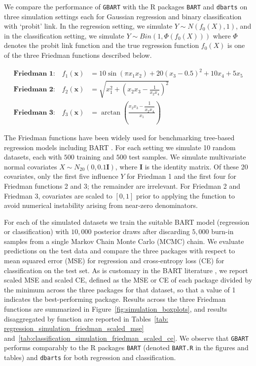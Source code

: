 \documentclass[12pt]{article}
\newcommand{\1}{\mathbb{I}}
\theoremstyle{plain}
\theoremstyle{definition}
\theoremstyle{remark}
\begin{document}
We compare the performance of \texttt{GBART} with the R packages \texttt{BART} and \texttt{dbarts} on three simulation settings each for Gaussian regression and binary classification with `probit' link. In the regression setting, we simulate $Y \sim N(f_0(X), 1)$, and in the classification setting, we simulate $Y \sim Bin(1,\Phi(f_0(X)))$ where $\Phi$ denotes the probit link function and the true regression function $f_0(X)$ is one of the three Friedman functions \citep{friedman1991multivariate, friedman1993} described below.

\begin{align}
\textbf{Friedman 1:} \quad f_1(\mathbf{x}) &= 10\sin(\pi x_1 x_2) + 20\left(x_3 - 0.5\right)^2 + 10x_4 + 5x_5 \label{eq:friedman1} \\[6pt]
\textbf{Friedman 2:} \quad f_2(\mathbf{x}) &= \sqrt{x_1^2 + \left(x_2 x_3 - \frac{1}{x_2 x_4}\right)^2} \label{eq:friedman2} \\[6pt]
\textbf{Friedman 3:} \quad f_3(\mathbf{x}) &= \arctan\left(\frac{x_2 x_3 - \dfrac{1}{x_2 x_4}}{x_1}\right) \label{eq:friedman3}
\end{align}

The Friedman functions have been widely used for benchmarking tree-based regression models including BART \citep{chipman2010bart, linero2025generalized}. For each setting we simulate 10 random datasets, each with $500$ training and $500$ test samples. We simulate multivariate normal covariates $X \sim N_{20}(0, 0.1\mathbf{I})$, where $\mathbf{I}$ is the identity matrix. Of these 20 covariates, only the first five influence $Y$ for Friedman 1 and the first four for Friedman functions 2 and 3; the remainder are irrelevant. For Friedman 2 and Friedman 3, covariates are scaled to $[0,1]$ prior to applying the function to avoid numerical instability arising from near-zero denominators.

For each of the simulated datasets we train the suitable BART model (regression or classification) with $10{,}000$ posterior draws after discarding $5{,}000$ burn-in samples from a single Markov Chain Monte Carlo (MCMC) chain. We evaluate predictions on the test data and compare the three packages with respect to mean squared error (MSE) for regression and cross-entropy loss (CE) for classification on the test set. As is customary in the BART literature \citep{chipman2010bart}, we report scaled MSE and scaled CE, defined as the MSE or CE of each package divided by the minimum across the three packages for that dataset, so that a value of 1 indicates the best-performing package. Results across the three Friedman functions are summarized in Figure~\ref{fig:simulation_boxplots}, and results disaggregated by function are reported in Tables~\ref{tab: regression_simulation_friedman_scaled_mse} and~\ref{tab:classification_simulation_friedman_scaled_ce}. We observe that \texttt{GBART} performs comparably to the R packages \texttt{BART} (denoted \texttt{BART.R} in the figures and tables) and \texttt{dbarts} for both regression and classification.
\end{document}
